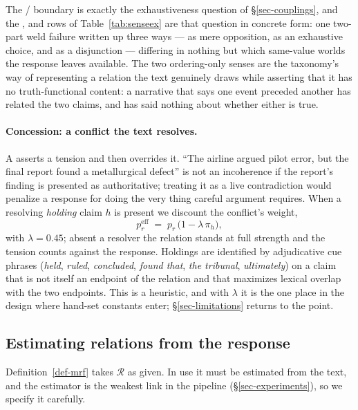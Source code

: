 The / boundary is exactly the exhaustiveness question of
\S\ref{sec-couplings}, and the ,  and  rows of
Table~\ref{tab:senseex} are that question in concrete form: one two-part weld failure written up
three ways --- as mere opposition, as an exhaustive choice, and as a disjunction --- differing in
nothing but which same-value worlds the response leaves available. The two
ordering-only senses are the taxonomy's way of representing a
relation the text genuinely draws while asserting that it has no truth-functional content: a
narrative that says one event preceded another has related the two claims, and has said nothing
about whether either is true.

\paragraph{Concession: a conflict the text resolves.} A  asserts a tension and
then overrides it. ``The airline argued pilot error, but the final report found a metallurgical
defect'' is not an incoherence if the report's finding is presented as authoritative; treating it
as a live contradiction would penalize a response for doing the very thing careful argument
requires. When a resolving \emph{holding} claim $h$ is present we discount the conflict's weight,
\begin{equation}
p_r^{\mathrm{eff}} \;=\; p_r\,\bigl(1-\lambda\,\pi_h\bigr),
\label{eq-concession}
\end{equation}
with $\lambda=0.45$; absent a resolver the relation stands at full strength and the tension counts
against the response. Holdings are identified by adjudicative cue phrases (\emph{held},
\emph{ruled}, \emph{concluded}, \emph{found that}, \emph{the tribunal}, \emph{ultimately}) on a
claim that is not itself an endpoint of the relation and that maximizes lexical overlap with the
two endpoints. This is a heuristic, and with $\lambda$ it is the one place in the design where
hand-set constants enter; \S\ref{sec-limitations} returns to the point.

\subsection{Estimating relations from the response}
\label{sec-mining}

Definition~\ref{def-mrf} takes $\mathcal{R}$ as given. In use it must be estimated from the text,
and the estimator is the weakest link in the pipeline (\S\ref{sec-experiments}), so we specify it
carefully.

